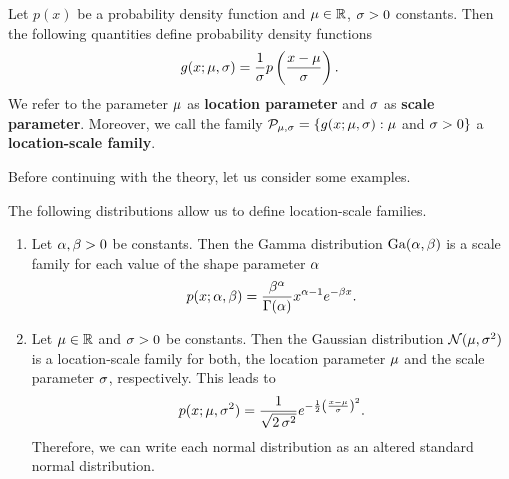 \begin{theorem}\label{theorem:pdf_gen}
Let $p(x)$ be a probability density function and $\operatorname{\mu}\in\operatorname{\mathbb{R}}$, $\operatorname{\sigma} > 0$ constants. Then the following quantities define probability density functions
\begin{align*}
g(x;\operatorname{\mu},\operatorname{\sigma}) = \frac{1}{\operatorname{\sigma}} p\left( \frac{x - \operatorname{\mu}}{\operatorname{\sigma}} \right).
\end{align*}
We refer to the parameter $\operatorname{\mu}$ as \textbf{location parameter} and $\operatorname{\sigma}$ as \textbf{scale parameter}. Moreover, we call the family $\mathcal{P}_{\operatorname{\mu},\operatorname{\sigma}} = \{g(x;\operatorname{\mu},\operatorname{\sigma}):\operatorname{\mu}$ and $\operatorname{\sigma} > 0\}$ a \textbf{location-scale family}.
\end{theorem}

Before continuing with the theory, let us consider some examples.

\begin{example}\label{ex:loc-scale_fam}
The following distributions allow us to define location-scale families.
\begin{enumerate}
\item Let $\alpha,\beta >0$ be constants. Then the Gamma distribution $\text{Ga}(\alpha,\beta)$ is a scale family for each value of the shape parameter $\alpha$
\begin{align*}
p(x;\alpha,\beta) = \frac{\beta^\alpha}{\Gamma(\alpha)}x^{\alpha-1} e^{-\beta x}.
\end{align*}
\item Let $\operatorname{\mu}\in\operatorname{\mathbb{R}}$ and $\operatorname{\sigma}>0$ be constants. Then the Gaussian distribution $\mathcal{N}(\operatorname{\mu},\operatorname{\sigma}^2)$ is a location-scale family for both, the location parameter $\operatorname{\mu}$ and the scale parameter $\operatorname{\sigma}$, respectively. This leads to
\begin{align*}
p(x; \operatorname{\mu}, \operatorname{\sigma}^2) = \frac{1}{\sqrt{2\operatorname{\sigma}^2}} e^{-\frac{1}{2} \left( \frac{x-\operatorname{\mu}}{\operatorname{\sigma}} \right)^2}.
\end{align*}
Therefore, we can write each normal distribution as an altered standard normal distribution.
\end{enumerate}
\end{example}

